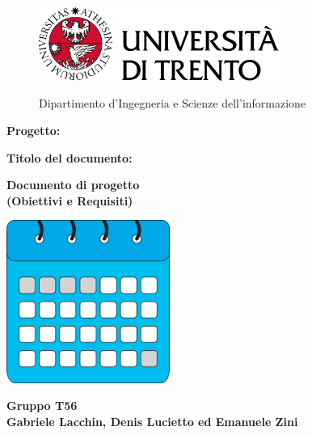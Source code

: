 \begin{titlepage}
    \begin{figure}[!htb]
        \includegraphics[width=0.7\textwidth]{img/logo_unitn.png}
        \endminipage
        \hfill
        \begin{flushright}
            \Large
            Dipartimento d'Ingegneria e Scienze dell'informazione
        \end{flushright}
        \endminipage
        \hfill
    \end{figure}

    \vspace{3cm}

    \large
    \textbf{Progetto:}
    \begin{center}
        \Huge
        \color{blue}
        \textbf{\nome}
    \end{center}

    \vspace{1cm}

    \textbf{Titolo del documento:}
    \begin{center}
        \huge
        \color{blue}
        \textbf{Documento di progetto}\\
        \textbf{(Obiettivi e Requisiti)}
    \end{center}

    \vspace{3cm}

    \begin{center}
        \includegraphics[width=0.4\textwidth]{img/logo.jpg}
    \end{center}
    \vspace{3cm}

    \begin{center}
        \large
        \textbf{Gruppo T56}\\
        \textbf{Gabriele Lacchin, Denis Lucietto ed Emanuele Zini}
    \end{center}

\end{titlepage}
